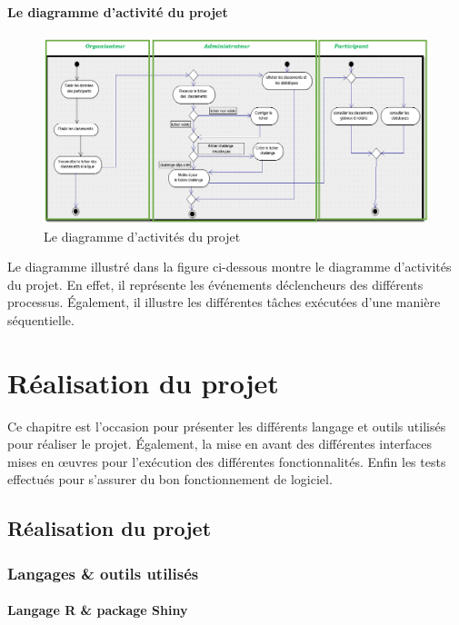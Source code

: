 \documentclass[12pt,a4paper]{report}
\begin{document}
\subsubsection{Le diagramme d'activité du projet}
\begin{figure}
	   \center
	   \includegraphics[scale=0.9]{img/Diagramme_activites.png}
	   \caption {Le diagramme d’activités du projet}
\end{figure}

Le diagramme illustré dans la figure ci-dessous montre le diagramme d’activités du projet. En effet, il représente les événements déclencheurs des différents processus. Également, il illustre les différentes tâches exécutées d’une manière séquentielle. 
\newpage


\chapter{Réalisation du projet}
Ce chapitre est l’occasion pour présenter les différents langage et outils utilisés pour réaliser le projet. Également, la mise en avant des différentes interfaces mises en œuvres pour l’exécution des différentes fonctionnalités. Enfin les tests effectués pour s’assurer du bon fonctionnement de logiciel.

\newpage


\section {Réalisation du projet }
\subsection {Langages \& outils utilisés}
\subsubsection {Langage R \& package Shiny}
\end{document}
